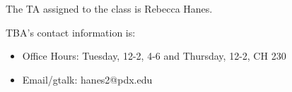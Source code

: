 The TA assigned to the class is Rebecca Hanes. 

TBA's contact information is:
\begin{itemize}
\item Office Hours: Tuesday, 12-2, 4-6 and Thursday, 12-2, CH 230
\item Email/gtalk: hanes2@pdx.edu
\end{itemize}
